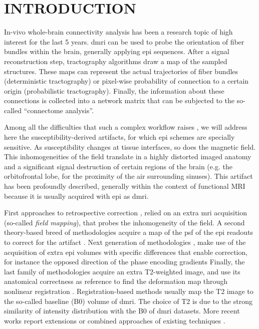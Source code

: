 \section{INTRODUCTION}

In-vivo whole-brain connectivity analysis has been a
research topic of high interest for the last
5 years. 
\Gls*{dmri} can be used to probe the
orientation of fiber bundles within the brain,
generally applying \gls*{epi} sequences.
After a signal reconstruction step, 
tractography algorithms draw a map of the sampled 
structures.
These maps can represent the actual trajectories
of fiber bundles (deterministic tractography) or
pixel-wise probability of connection to a certain origin
(probabilistic tractography). Finally, the
information about these connections is collected
into a network matrix that can be subjected to
the so-called ``connectome analysis''.

Among all the difficulties that such a complex workflow
raises \cite{jones_twenty-five_2010}, we will
address here the susceptibility-derived artifacts,
for which \Gls*{epi} schemes are specially sensitive.
As susceptibility changes at tissue interfaces,
so does the magnetic field. This inhomogeneities 
of the field translate in a highly distorted imaged 
anatomy and a significant signal  destruction of 
certain regions of the brain 
(e.g. the orbitofrontal lobe, for the proximity of the
air surrounding sinuses). This artifact has been
profoundly described, generally within the context of
functional MRI because it is usually acquired with 
\gls*{epi} as \gls*{dmri}. 

First approaches to
retrospective correction \cite{jezzard_correction_1995},
relied on an extra \gls*{mri} acquisition (so-called
\emph{field mapping}), that probes the inhomogeneity of the field.
A second theory-based breed of methodologies acquire a 
map of the \gls*{psf} of the \gls*{epi} readouts to correct 
for the artifact \cite{robson_measurement_1997}. 
Next generation of methodologies \cite{cordes_geometric_2000,
chiou_simple_2000}, make use of the acquisition of 
extra \gls*{epi} volumes 
with specific differences that enable correction, for instance
the opposed direction of the phase encoding gradients 
Finally, the last family of methodologies acquire an 
extra T2-weighted image, and use its anatomical correctness 
as reference to find the deformation map through nonlinear 
registration \cite{kybic_unwarping_2000,studholme_accurate_2000}.
Registration-based methods usually map
the T2 image to the so-called baseline (B0) volume 
of \gls*{dmri}. The choice of T2 is due to the strong
similarity of intensity distribution with the B0 of \gls*{dmri}
datasets. More recent works report extensions or combined
approaches of existing techniques
\cite{andersson_how_2003,zaitsev_point_2004,%
holland_efficient_2010,andersson_comprehensive_2012}.

